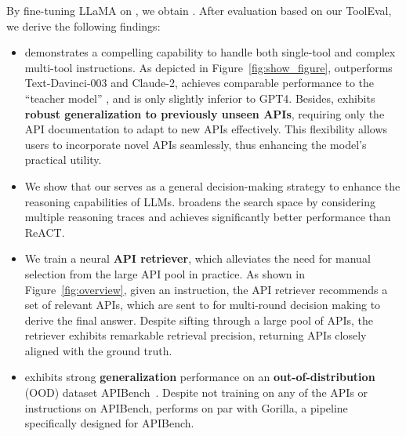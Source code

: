 By fine-tuning LLaMA on \ourdata, we obtain \textbf{\ourmodel}. After evaluation based on our ToolEval, we derive the following findings:

\begin{itemize} [topsep=1pt, partopsep=1pt, leftmargin=12pt, itemsep=-1pt]
    \item \ourmodel demonstrates a compelling capability to handle both single-tool and complex multi-tool instructions. As depicted in Figure~\ref{fig:show_figure}, \ourmodel outperforms Text-Davinci-003 and Claude-2, achieves comparable performance to the ``teacher model'' \turbo, and is only slightly inferior to GPT4.
    Besides, \ourmodel exhibits \textbf{robust generalization to previously unseen APIs}, requiring only the API documentation to adapt to new APIs effectively. This flexibility allows users to incorporate novel APIs seamlessly, thus enhancing the model's practical utility.

    \item We show that our \dfs serves as a general decision-making strategy to enhance the reasoning capabilities of LLMs. \dfs broadens the search space by considering multiple reasoning traces and achieves significantly better performance than ReACT.

    \item We train a neural \textbf{API retriever}, which alleviates the need for manual selection from the large API pool in practice. As shown in Figure~\ref{fig:overview}, given an instruction, the API retriever recommends a set of relevant APIs, which are sent to \ourmodel for multi-round decision making to derive the final answer.
    Despite sifting through a large pool of APIs, the retriever exhibits remarkable retrieval precision, returning APIs closely aligned with the ground truth.

    \item \ourmodel exhibits strong \textbf{generalization} performance on an \textbf{out-of-distribution} (OOD) dataset APIBench~\citep{patil2023gorilla}. Despite not training on any of the APIs or instructions on APIBench, \ourmodel performs on par with Gorilla, a pipeline specifically designed for APIBench.
\end{itemize}

